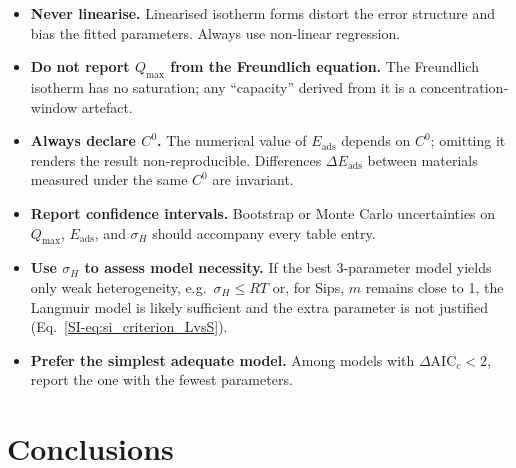 \documentclass[journal=jacsat,manuscript=article]{achemso}
\begin{document}
	\begin{itemize}
		\item \textbf{Never linearise.} Linearised isotherm forms distort the error structure and bias the fitted parameters. Always use non-linear regression.
		\item \textbf{Do not report $Q_{\max}$ from the Freundlich equation.} The Freundlich isotherm has no saturation; any ``capacity'' derived from it is a concentration-window artefact.
		\item \textbf{Always declare $C^{0}$.} The numerical value of $E_{\mathrm{ads}}$ depends on $C^{0}$; omitting it renders the result non-reproducible. Differences $\Delta E_{\mathrm{ads}}$ between materials measured under the same $C^{0}$ are invariant.
		\item \textbf{Report confidence intervals.} Bootstrap or Monte Carlo uncertainties on $Q_{\max}$, $E_{\mathrm{ads}}$, and $\sigma_H$ should accompany every table entry.
		\item \textbf{Use $\sigma_H$ to assess model necessity.} If the best 3-parameter model yields only weak heterogeneity, e.g.\ $\sigma_H \leq RT$ or, for Sips, $m$ remains close to 1, the Langmuir model is likely sufficient and the extra parameter is not justified (Eq.~\ref{SI-eq:si_criterion_LvsS}).
		\item \textbf{Prefer the simplest adequate model.} Among models with $\Delta\mathrm{AIC}_c < 2$, report the one with the fewest parameters.
	\end{itemize}

	\section{Conclusions}
	\label{sec:conclusions}


\end{document}
